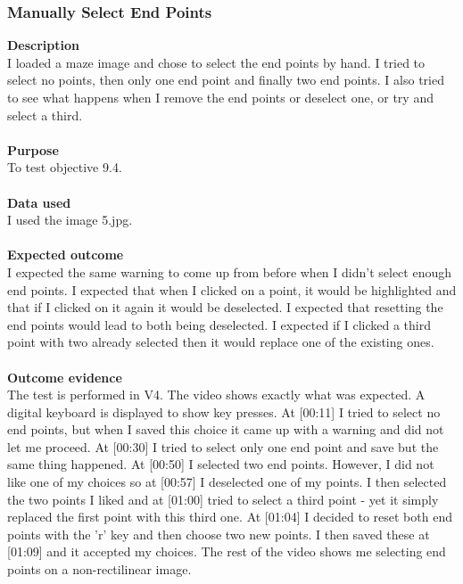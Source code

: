 \documentclass[titlepage]{article}
\begin{document}
\subsubsection{Manually Select End Points}
\textbf{Description}\\
I loaded a maze image and chose to select the end points by hand. I tried to select no points, then only one end point and finally two end points. I also tried to see what happens when I remove the end points or deselect one, or try and select a third.\\\\
\textbf{Purpose}\\
To test objective 9.4.\\\\
\textbf{Data used} \\
I used the image 5.jpg.\\\\
\textbf{Expected outcome}\\
I expected the same warning to come up from before when I didn't select enough end points. I expected that when I clicked on a point, it would be highlighted and that if I clicked on it again it would be deselected. I expected that resetting the end points would lead to both being deselected. I expected if I clicked a third point with two already selected then it would replace one of the existing ones.\\\\
\textbf{Outcome evidence}\\
The test is performed in V4. The video shows exactly what was expected. A digital keyboard is displayed to show key presses. At [00:11] I tried to select no end points, but when I saved this choice it came up with a warning and did not let me proceed. At [00:30] I tried to select only one end point and save but the same thing happened. At [00:50] I selected two end points. However, I did not like one of my choices so at [00:57] I deselected one of my points. I then selected the two points I liked and at [01:00] tried to select a third point - yet it simply replaced the first point with this third one. At [01:04] I decided to reset both end points with the 'r' key and then choose two new points. I then saved these at [01:09] and it accepted my choices. The rest of the video shows me selecting end points on a non-rectilinear image.
\end{document}

